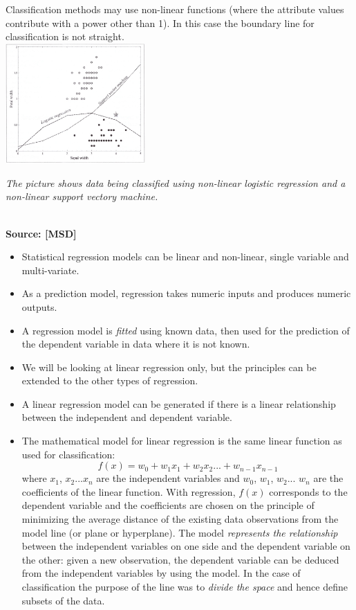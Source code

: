 Classification methods may use non-linear functions (where the attribute values contribute with a power other than 1). In this case the boundary line for classification is not straight. \\
  \includegraphics[width=0.4\textwidth]{4-13cc_non-linear_classifiers.jpg} \parbox[t]{0.3\textwidth}{\vspace{-20ex}\tiny \emph{The picture shows data being classified using non-linear logistic regression and a non-linear support vectory machine. }} \\ [-2ex]
  {\fontsize{10}{0}\selectfont \textbf{Source: [MSD]}} 
\newpage
  
\begin{itemize}
\item Statistical regression models can be linear and non-linear, single variable and multi-variate.
\item As a prediction model, regression takes numeric inputs and produces numeric outputs.
\item A regression model is \emph{fitted} using known data, then used for the prediction of the dependent variable in data where it is not known. 
\item We will be looking at linear regression only, but the principles can be extended to the other types of regression.
\item A linear regression model can be generated if there is a linear relationship between the independent and dependent variable.
\item The mathematical model for linear regression is the same linear function as used for classification:
    $$ f(x) = w_0 + w_1 x_1 + w_2 x_2 ... + w_{n-1} x_{n-1} $$
    where $x_1$, $x_2$...$ x_n$ are the independent variables and $w_0$, $w_1$, $w_2$... $w_n$ are the coefficients of the linear function. With regression, $f(x)$ corresponds to the dependent variable and the coefficients are chosen on the principle of minimizing the average distance of the existing data observations from the model line (or plane or hyperplane). The model \emph{represents the relationship} between the independent variables on one side and the dependent variable on the other: given a new observation, the dependent variable can be deduced from the independent variables by using the model. In the case of classification the purpose of the line was to \emph{divide the space} and hence define subsets of the data.
\end{itemize}
  

